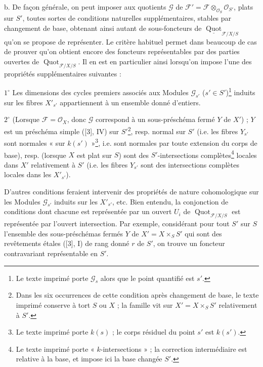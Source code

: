 \medskip
\noindent b. De façon générale, on peut imposer aux quotients $\mathcal G$ de
$\mathcal F'=\mathcal F\otimes_{\mathcal O_S}\mathcal O_{S'}$, plats sur $S'$,
toutes sortes de conditions naturelles supplémentaires, stables par changement
de base, obtenant ainsi autant de sous-foncteurs de
$\underline{\operatorname{Quot}}_{\mathcal F/X/S}$ qu'on se propose de
représenter. Le critère habituel permet dans beaucoup de cas de prouver qu'on
obtient encore des foncteurs représentables par des parties ouvertes de
$\operatorname{Quot}_{\mathcal F/X/S}$. Il en est en particulier ainsi
lorsqu'on impose l'une des propriétés supplémentaires suivantes :

\smallskip
\noindent $1^\circ$ Les dimensions des cycles premiers associés aux Modules
$\mathcal G_{s'}$ ($s'\in S'$)\footnote{Le texte imprimé porte $\mathcal G_s$ alors que le point quantifié est $s'$.} induits sur les fibres $X'_{s'}$ appartiennent
à un ensemble donné d'entiers.

\smallskip
\noindent $2^\circ$ (Lorsque $\mathcal F=\mathcal O_X$, donc $\mathcal G$
correspond à un sous-préschéma fermé $Y$ de $X'$) ; $Y$ est un préschéma simple
([3], IV) sur $S'$\footnote{Dans les six occurrences de cette condition après changement de base, le texte imprimé conserve à tort $S$ ou $X$ ; la famille vit sur $X'=X\times_SS'$ relativement à $S'$.}, resp. normal sur $S'$ (i.e. les fibres $Y_{s'}$ sont normales
« sur $k(s')$ »\footnote{Le texte imprimé porte $k(s)$ ; le corps résiduel du point $s'$ est $k(s')$.}, i.e. sont normales par toute extension du corps de base),
resp. (lorsque $X$ est plat sur $S$) sont des $S'$-intersections complètes\footnote{Le texte imprimé porte « $k$-intersections » ; la correction intermédiaire est relative à la base, et impose ici la base changée $S'$.}
locales dans $X'$ relativement à $S'$ (i.e. les fibres $Y_{s'}$ sont des
intersections complètes locales dans les $X'_{s'}$).

D'autres conditions feraient intervenir des propriétés de nature
cohomologique sur les Modules $\mathcal G_{s'}$ induits sur les $X'_{s'}$,
etc. Bien entendu, la conjonction de conditions dont chacune est représentée
par un ouvert $U_i$ de $\operatorname{Quot}_{\mathcal F/X/S}$ est représentée
par l'ouvert intersection. Par exemple, considérant pour tout $S'$ sur $S$
l'ensemble des sous-préschémas fermés $Y$ de $X'=X\times_SS'$ qui sont des
revêtements étales ([3], I) de rang donné $r$ de $S'$, on trouve un foncteur
contravariant représentable en $S'$.

